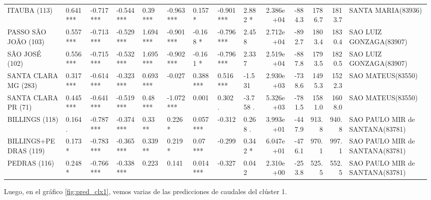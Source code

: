 \documentclass[12pt,oneside]{book}\usepackage[]{graphicx}\usepackage[]{color}
\newenvironment{knitrout}{}{} %
\theoremstyle{definition} %
\begin{document}
\begin{knitrout}
\begin{landscape}
\begin{table}
{\begin{tabular}[t]{lllllllllrrrrl}
ITAUBA (113) & 0.641 *** & -0.717 *** & -0.544 *** & 0.39 *** & -0.963 *** & 0.157 * & -0.901 *** & 2.882 * & 2.386e+04 & -884.3 & 1786.7 & 1813.7 & SANTA MARIA(83936)\\
\rowcolor{gray!6}  PASSO SÃO JOÃO (103) & 0.557 *** & -0.713 *** & -0.529 *** & 1.694 *** & -0.901 *** & -0.168 * & -0.796 *** & 2.458 & 2.712e+04 & -892.7 & 1803.4 & 1830.4 & SAO LUIZ GONZAGA(83907)\\
\addlinespace
SÃO JOSÉ (102) & 0.556 *** & -0.715 *** & -0.532 *** & 1.695 *** & -0.902 *** & -0.161 * & -0.796 *** & 2.337 & 2.519e+04 & -887.8 & 1793.5 & 1820.5 & SAO LUIZ GONZAGA(83907)\\
\rowcolor{gray!6}  SANTA CLARA MG (283) & 0.317 *** & -0.614 *** & -0.323 *** & 0.693 *** & -0.027 & 0.388 *** & 0.516 *** & -1.531 & 2.930e+03 & -738.6 & 1495.3 & 1522.3 & SAO MATEUS(83550)\\
SANTA CLARA PR (71) & 0.445 *** & -0.641 *** & -0.519 *** & 0.48 *** & -1.072 *** & 0.001 & 0.302 . & -3.758 . & 5.326e+03 & -781.5 & 1581.0 & 1608.0 & SAO MATEUS(83550)\\
\rowcolor{gray!6}  BILLINGS (118) & 0.164 . & -0.787 *** & -0.374 *** & 0.33 ** & 0.226 * & 0.057 *** & -0.312 & 0.268 . & 3.993e+01 & -447.9 & 913.8 & 940.8 & SAO PAULO MIR de SANTANA(83781)\\
BILLINGS+PEDRAS (119) & 0.173 * & -0.783 *** & -0.365 *** & 0.339 ** & 0.219 * & 0.07 *** & -0.299 & 0.342 * & 6.047e+01 & -476.1 & 970.1 & 997.1 & SAO PAULO MIR de SANTANA(83781)\\
\addlinespace
\rowcolor{gray!6}  PEDRAS (116) & 0.248 * & -0.766 *** & -0.338 *** & 0.223 & 0.141 & 0.014 *** & -0.327 & 0.042 & 2.310e+00 & -253.8 & 525.5 & 552.5 & SAO PAULO MIR de SANTANA(83781)\\
\bottomrule
\end{tabular}}
\end{table}
\end{landscape}


\end{knitrout}

Luego, en el gráfico \ref{fig:pred_clx1}, vemos varias de las predicciones de caudales del clúster 1.
\end{document}
